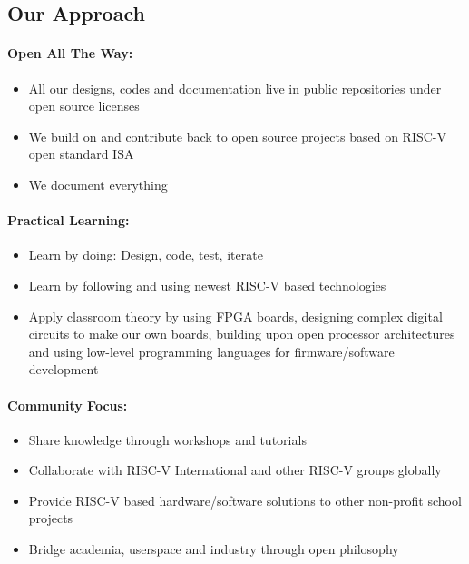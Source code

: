 \documentclass{article}
\begin{document}
\subsection{Our Approach}

\paragraph{Open All The Way:}

\begin{itemize}
    \item All our designs, codes and documentation live in public repositories under open source licenses
    \item We build on and contribute back to open source projects based on RISC-V open standard ISA
    \item We document everything
\end{itemize}

\paragraph{Practical Learning:}

\begin{itemize}
    \item Learn by doing: Design, code, test, iterate
    \item Learn by following and using newest RISC-V based technologies
    \item Apply classroom theory by using FPGA boards, designing complex digital circuits to make our own boards, building upon open processor architectures and using low-level programming languages for firmware/software development
\end{itemize}

\paragraph{Community Focus:}

\begin{itemize}
    \item Share knowledge through workshops and tutorials
    \item Collaborate with RISC-V International and other RISC-V groups globally
    \item Provide RISC-V based hardware/software solutions to other non-profit school projects
    \item Bridge academia, userspace and industry through open philosophy
\end{itemize}
\end{document}
